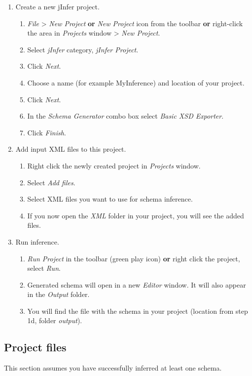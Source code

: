 \documentclass[a4paper,10pt,oneside]{article}
\begin{document}
\begin{enumerate}\item 
 Create a new jInfer project.
    \begin{enumerate}\item 
        \textit{File} > \textit{New Project} \textbf{or} \textit{New Project} icon from the toolbar \textbf{or} right-click the area in \textit{Projects} window > \textit{New Project}.
      \item Select \textit{jInfer} category, \textit{jInfer Project}.
      \item Click \textit{Next}.
      \item Choose a name (for example MyInference) and location of your project.
      \item Click \textit{Next}.
      \item In the \textit{Schema Generator} combo box select \textit{Basic XSD Exporter}.
      \item Click \textit{Finish}.
      \end{enumerate}
  \item Add input XML files to this project.
    \begin{enumerate}\item 
  Right click the newly created project in \textit{Projects} window.
      \item Select \textit{Add files}.
      \item Select XML files you want to use for schema inference.
      \item If you now open the \textit{XML} folder in your project, you will see the added files.
      \end{enumerate}
  \item Run inference.
    \begin{enumerate}\item 
        \textit{Run Project} in the toolbar (green play icon) \textbf{or} right click the project, select \textit{Run}.
      \item Generated schema will open in a new \textit{Editor} window. It will also appear in the \textit{Output} folder.
      \item You will find the file with the schema in your project (location from step 1d, folder \textit{output}).
      \end{enumerate}
  \end{enumerate}
\subsection*{Project files}\par 
  This section assumes you have successfully inferred at least one schema.
\end{document}
